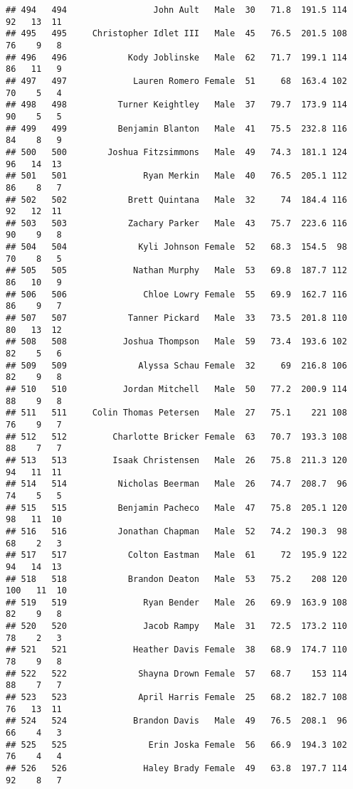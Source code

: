 \documentclass[
]{article}
\begin{document}
\begin{verbatim}
## 494   494                 John Ault   Male  30   71.8  191.5 114  92   13  11
## 495   495     Christopher Idlet III   Male  45   76.5  201.5 108  76    9   8
## 496   496            Kody Joblinske   Male  62   71.7  199.1 114  86   11   9
## 497   497             Lauren Romero Female  51     68  163.4 102  70    5   4
## 498   498          Turner Keightley   Male  37   79.7  173.9 114  90    5   5
## 499   499          Benjamin Blanton   Male  41   75.5  232.8 116  84    8   9
## 500   500        Joshua Fitzsimmons   Male  49   74.3  181.1 124  96   14  13
## 501   501               Ryan Merkin   Male  40   76.5  205.1 112  86    8   7
## 502   502            Brett Quintana   Male  32     74  184.4 116  92   12  11
## 503   503            Zachary Parker   Male  43   75.7  223.6 116  90    9   8
## 504   504              Kyli Johnson Female  52   68.3  154.5  98  70    8   5
## 505   505             Nathan Murphy   Male  53   69.8  187.7 112  86   10   9
## 506   506               Chloe Lowry Female  55   69.9  162.7 116  86    9   7
## 507   507            Tanner Pickard   Male  33   73.5  201.8 110  80   13  12
## 508   508           Joshua Thompson   Male  59   73.4  193.6 102  82    5   6
## 509   509              Alyssa Schau Female  32     69  216.8 106  82    9   8
## 510   510           Jordan Mitchell   Male  50   77.2  200.9 114  88    9   8
## 511   511     Colin Thomas Petersen   Male  27   75.1    221 108  76    9   7
## 512   512         Charlotte Bricker Female  63   70.7  193.3 108  88    7   7
## 513   513         Isaak Christensen   Male  26   75.8  211.3 120  94   11  11
## 514   514          Nicholas Beerman   Male  26   74.7  208.7  96  74    5   5
## 515   515          Benjamin Pacheco   Male  47   75.8  205.1 120  98   11  10
## 516   516          Jonathan Chapman   Male  52   74.2  190.3  98  68    2   3
## 517   517            Colton Eastman   Male  61     72  195.9 122  94   14  13
## 518   518            Brandon Deaton   Male  53   75.2    208 120 100   11  10
## 519   519               Ryan Bender   Male  26   69.9  163.9 108  82    9   8
## 520   520               Jacob Rampy   Male  31   72.5  173.2 110  78    2   3
## 521   521             Heather Davis Female  38   68.9  174.7 110  78    9   8
## 522   522              Shayna Drown Female  57   68.7    153 114  88    7   7
## 523   523              April Harris Female  25   68.2  182.7 108  76   13  11
## 524   524             Brandon Davis   Male  49   76.5  208.1  96  66    4   3
## 525   525                Erin Joska Female  56   66.9  194.3 102  76    4   4
## 526   526               Haley Brady Female  49   63.8  197.7 114  92    8   7

\end{verbatim}
\end{document}
